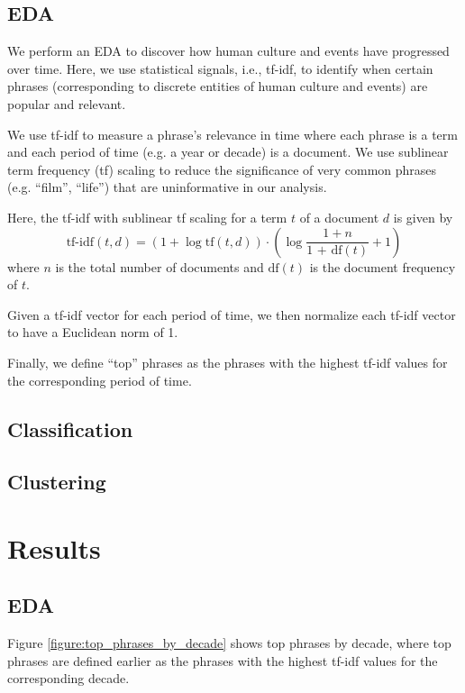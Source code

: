 \documentclass{article}
\begin{document}
\begin{multicols}{2}
\subsection{EDA}
We perform an EDA to discover how human culture and events have progressed over time. Here, we use statistical signals, i.e., tf-idf, to identify when certain phrases (corresponding to discrete entities of human culture and events) are popular and relevant.

We use tf-idf to measure a phrase's relevance in time where each phrase is a term and each period of time (e.g. a year or decade) is a document. We use sublinear term frequency (tf) scaling to reduce the significance of very common phrases (e.g. ``film'', ``life'') that are uninformative in our analysis.

Here, the tf-idf with sublinear tf scaling for a term $t$ of a document $d$ is given by
$$\text{tf-idf}(t, d) = (1 + \log\text{tf}(t, d)) \cdot \left(\log\frac{1 + n}{\text{1 + df}(t)} + 1\right)$$
where $n$ is the total number of documents and $\text{df}(t)$ is the document frequency of $t$.

Given a tf-idf vector for each period of time, we then normalize each tf-idf vector to have a Euclidean norm of 1.

Finally, we define ``top'' phrases as the phrases with the highest tf-idf values for the corresponding period of time.
\subsection{Classification}
\subsection{Clustering}

\section{Results} %
\subsection{EDA}
Figure \ref{figure:top_phrases_by_decade} shows top phrases by decade, where top phrases are defined earlier as the phrases with the highest tf-idf values for the corresponding decade.


\end{multicols}
\end{document}
